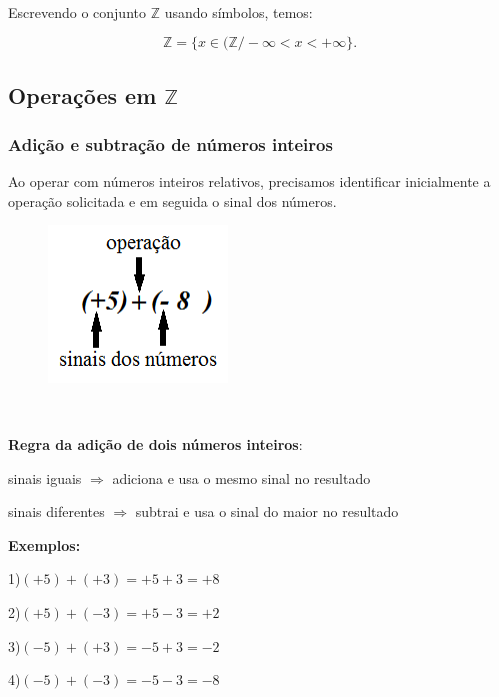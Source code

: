 ~~

Escrevendo o conjunto $\mathbb{Z}$  usando símbolos, temos: 

$$\mathbb{Z} = \{x \in (\mathbb{Z} / -\infty < x < +\infty \} .$$

\subsection{Operações em $\mathbb{Z}$}

\subsubsection{Adição e subtração de números inteiros}

Ao operar com números inteiros relativos, precisamos identificar inicialmente a operação solicitada e em seguida o sinal dos números.

\begin{figure}[H]
	\begin{Center}
		\includegraphics[width=1.88in,height=1.64in]{capitulos/conjuntos_numericos/media/image7.png}
	\end{Center}
\end{figure}

~~
\begin{center}
\textbf{Regra da adição de dois números inteiros}:
\end{center}

\begin{caixa}
    sinais iguais $\Rightarrow$ adiciona e usa o mesmo sinal no resultado

    sinais diferentes $\Rightarrow$ subtrai e usa o sinal do maior no resultado

\end{caixa}
\textbf{Exemplos:}
\begin{multicols}{2}
    1)$(+5) + (+3) = +5+3 = +8$ 

    2)$(+5) + (- 3) = +5 - 3 = +2$ 
    
    3)$(-5) + (+ 3) = -5 + 3 = -2$

    4)$(-5) + (- 3) = -5 - 3 = -8$
\end{multicols}
